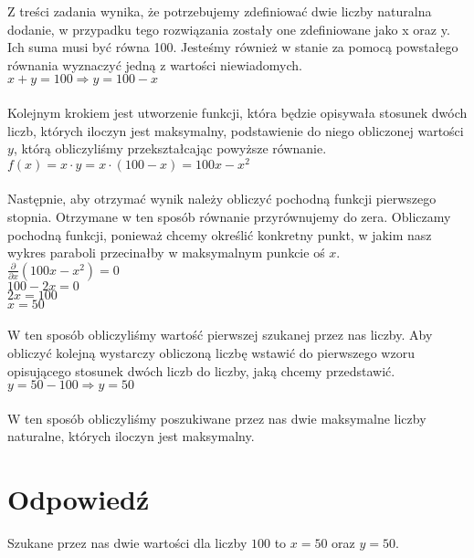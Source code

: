 \documentclass[UTF8]{article}
\begin{document}
Z treści zadania wynika, że potrzebujemy zdefiniować dwie liczby naturalna dodanie, w przypadku tego rozwiązania zostały one zdefiniowane jako x oraz y. Ich suma musi być równa 100. Jesteśmy również w stanie za pomocą powstałego równania wyznaczyć jedną z wartości niewiadomych. ~
\\$x + y = 100 \Rightarrow y = 100 - x $\\
\\Kolejnym krokiem jest utworzenie funkcji, która będzie opisywała stosunek dwóch liczb, których iloczyn jest maksymalny, podstawienie do niego obliczonej wartości $y$, którą obliczyliśmy przekształcając powyższe równanie.~
\\$ f(x) = x \cdot y = x \cdot (100-x) = 100x - x^{2} $\\
\\Następnie, aby otrzymać wynik należy obliczyć pochodną funkcji pierwszego stopnia. Otrzymane w ten sposób równanie przyrównujemy do zera. Obliczamy pochodną funkcji,  ponieważ chcemy określić konkretny punkt, w jakim nasz wykres paraboli przecinałby w maksymalnym punkcie oś $ x $.~
\\$ \frac{\partial}{\partial x}(100x - x^{2}) = 0$
\\$100 - 2x = 0$
\\$2x = 100$
\\$x = 50 $\\
\\W ten sposób obliczyliśmy wartość pierwszej szukanej przez nas liczby. Aby obliczyć kolejną wystarczy obliczoną liczbę wstawić do pierwszego wzoru opisującego stosunek dwóch liczb do liczby, jaką chcemy przedstawić.~
\\$ y = 50 - 100 \Rightarrow y = 50 $\\
\\W ten sposób obliczyliśmy poszukiwane przez nas dwie maksymalne liczby naturalne, których iloczyn jest maksymalny.~

\section{Odpowiedź}

	Szukane przez nas dwie wartości dla liczby $100$ to $x = 50$ oraz $y = 50$. ~
\end{document}
